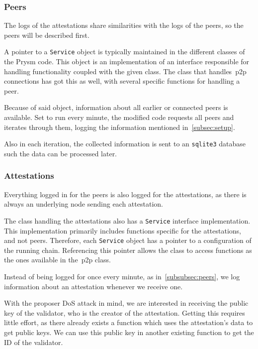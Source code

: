 \subsubsection{Peers}\label{subsubsec:peers}
The logs of the attestations share similarities with the logs of the peers, so the peers will be described first.

A pointer to a \texttt{Service} object is typically maintained in the different classes of the Prysm code.
This object is an implementation of an interface responsible for handling functionality coupled with the given class.
The class that handles~\gls{p2p} connections has got this as well, with several specific functions for handling a peer.

Because of said object, information about all earlier or connected peers is available.
Set to run every minute, the modified code requests all peers and iterates through them,
logging the information mentioned in~\autoref{subsec:setup}.


Also in each iteration,
the collected information is sent to an \texttt{sqlite3} database such the data can be processed later.

\subsubsection{Attestations}\label{subsubsec:attestations}
Everything logged in for the peers is also logged for the attestations,
as there is always an underlying node sending each attestation.

The class handling the attestations also has a \texttt{Service} interface implementation.
This implementation primarily includes functions specific for the attestations, and not peers.
Therefore, each \texttt{Service} object has a pointer to a configuration of the running chain.
Referencing this pointer allows the class to access functions as the ones available in the~\gls{p2p} class.

Instead of being logged for once every minute, as in~\autoref{subsubsec:peers},
we log information about an attestation whenever we receive one.

With the proposer DoS attack in mind, we are interested in receiving the public key of the validator,
who is the creator of the attestation.
Getting this requires little effort,
as there already exists a function which uses the attestation's data to get public keys.
We can use this public key in another existing function to get the ID of the validator.

